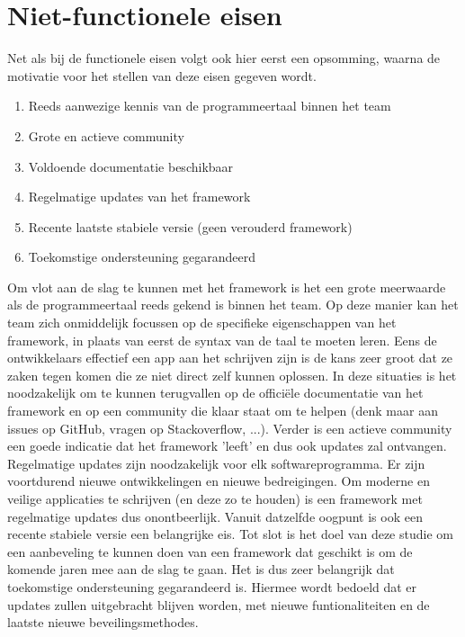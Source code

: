\section{Niet-functionele eisen}

Net als bij de functionele eisen volgt ook hier eerst een opsomming, waarna de motivatie voor het stellen van deze eisen gegeven wordt.

\begin{enumerate}
    \item Reeds aanwezige kennis van de programmeertaal binnen het team
    \item Grote en actieve community
    \item Voldoende documentatie beschikbaar
    \item Regelmatige updates van het framework
    \item Recente laatste stabiele versie (geen verouderd framework)
    \item Toekomstige ondersteuning gegarandeerd    
\end{enumerate}

Om vlot aan de slag te kunnen met het framework is het een grote meerwaarde als de programmeertaal reeds gekend is binnen het team. Op deze manier kan het team zich onmiddelijk focussen op de specifieke eigenschappen van het framework, in plaats van eerst de syntax van de taal te moeten leren. Eens de ontwikkelaars effectief een app aan het schrijven zijn is de kans zeer groot dat ze zaken tegen komen die ze niet direct zelf kunnen oplossen. In deze situaties is het noodzakelijk om te kunnen terugvallen op de officiële documentatie van het framework en op een community die klaar staat om te helpen (denk maar aan issues op GitHub, vragen op Stackoverflow, ...). Verder is een actieve community een goede indicatie dat het framework 'leeft' en dus ook updates zal ontvangen. Regelmatige updates zijn noodzakelijk voor elk softwareprogramma. Er zijn voortdurend nieuwe ontwikkelingen en nieuwe bedreigingen. Om moderne en veilige applicaties te schrijven (en deze zo te houden) is een framework met regelmatige updates dus onontbeerlijk. Vanuit datzelfde oogpunt is ook een recente stabiele versie een belangrijke eis. Tot slot is het doel van deze studie om een aanbeveling te kunnen doen van een framework dat geschikt is om de komende jaren mee aan de slag te gaan. Het is dus zeer belangrijk dat toekomstige ondersteuning gegarandeerd is. Hiermee wordt bedoeld dat er updates zullen uitgebracht blijven worden, met nieuwe funtionaliteiten en de laatste nieuwe beveilingsmethodes.